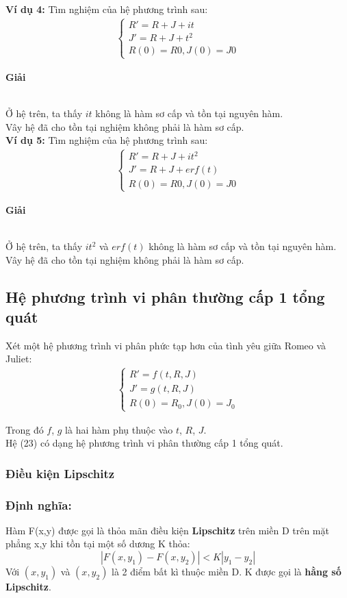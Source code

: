 \textbf{Ví dụ 4:} Tìm nghiệm của hệ phương trình sau:
\begin{align*}
    \begin{cases}
        R'=R+J+it\\
        J'=R+J+t^2 \\
        R(0)=R0, J(0)=J0
    \end{cases}
\end{align*}
\centerline{\textbf{Giải}}\\
Ở hệ trên, ta thấy $it$ không là hàm sơ cấp và tồn tại nguyên hàm.\\
Vây hệ đã cho tồn tại nghiệm không phải là hàm sơ cấp.\\

\textbf{Ví dụ 5:} Tìm nghiệm của hệ phương trình sau:
\begin{align*}
    \begin{cases}
        R'=R+J+it^2\\
        J'=R+J+erf(t) \\
        R(0)=R0, J(0)=J0
    \end{cases}
\end{align*}
\centerline{\textbf{Giải}}\\
Ở hệ trên, ta thấy $it^2$ và $erf(t)$ không là hàm sơ cấp và tồn tại nguyên hàm.\\
Vây hệ đã cho tồn tại nghiệm không phải là hàm sơ cấp.\\
\subsection{Hệ phương trình vi phân thường cấp 1 tổng quát}
Xét một hệ phương trình vi phân phức tạp hơn của tình yêu giữa Romeo và Juliet:
\begin{align}
    \begin{cases}
        R'=f(t,R,J)\\
        J'=g(t,R,J)\\
        R(0)=R_0, J(0)=J_0
    \end{cases}
\end{align}

Trong đó $f$, $g$ là hai hàm phụ thuộc vào $t$, $R$, $J$.\\
Hệ (23) có dạng hệ phương trình vi phân thường cấp 1 tổng quát.
\subsubsection{Điều kiện Lipschitz}
\subsubsection*{Định nghĩa:}
Hàm F(x,y) được gọi là thỏa mãn điều kiện \textbf{Lipschitz} trên miền D trên mặt phẳng x,y khi tồn tại một số dương K thỏa:
$$|F(x,y_1)-F(x,y_2)|<K|y_1-y_2|$$
Với $(x,y_1)$ và $(x,y_2)$ là 2 điểm bất kì thuộc miền D. K được gọi là \textbf{hằng số Lipschitz}.
